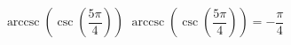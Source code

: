  {$\operatorname{arccsc}\left(\csc\left(\dfrac{5\pi}{4}\right) \right)$}
{ $\operatorname{arccsc}\left(\csc\left(\dfrac{5\pi}{4}\right) \right) = -\dfrac{\pi}{4}$}
